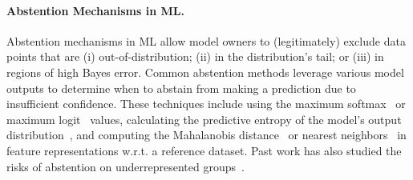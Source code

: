\paragraph{Abstention Mechanisms in ML.}
Abstention mechanisms in ML allow model owners to (legitimately) exclude data points that are (i) out-of-distribution; (ii) in the distribution's tail; or (iii) in regions of high Bayes error. Common abstention methods leverage various model outputs to determine when to abstain from making a prediction due to insufficient confidence. These techniques include using the maximum softmax~\citep{hendrycks2016baseline} or maximum logit~\citep{hendrycks2019scaling} values, calculating the predictive entropy of the model's output distribution~\citep{lakshminarayanan2017simple}, and computing the Mahalanobis distance~\citep{lee2018simple, ren2021simple} or nearest neighbors~\citep{raghuram2021general, dziedzic2022p, sun2022out} in feature representations w.r.t. a reference dataset. Past work has also studied the risks of abstention on underrepresented groups~\citep{jones2020selective}.





